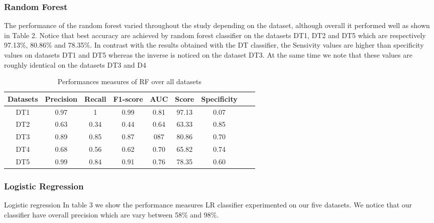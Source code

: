 \subsubsection{Random Forest}
The performance of the random forest varied throughout the study depending on the dataset, although overall it performed well as shown in Table 2. Notice that best accuracy are achieved by random forest classifier on the datasets DT1, DT2 and DT5 which are respectively 97.13\%, 80.86\% and 78.35\%. In contrast with the results obtained with the DT classifier, the Sensivity values are higher than specificity values on datasets DT1 and DT5 whereas the inverse is noticed on the dataset DT3. At the same time we note that these values are roughly identical on the datasets DT3 and D4
\begin{table}[!ht]
\centering
\begin{tabular}{*{7}{c}l r}
  \toprule
  \textbf{Datasets} & \textbf{Precision} & \textbf{Recall} & \textbf{F1-score}&\textbf{AUC} &\textbf{Score} &\textbf{Specificity}\\
   \midrule
  DT1 &0.97 &1   &0.99 &0.81 &97.13& 0.07\\
  DT2 &0.63  & 0.34  &0.44&0.64&63.33& 0.85\\
  DT3 &0.89 &0.85 &0.87&087&80.86&0.70\\
  DT4 &0.68 &0.56&0.62&0.70&65.82&0.74\\
  DT5 &0.99 &0.84&0.91&0.76&78.35&0.60\\
  
  
    \bottomrule
\end{tabular}
\caption{Performances measures of RF over all datasets}\label{perf-measure-dt1}
\end{table}


\subsubsection{Logistic Regression}

Logistic regression In table 3 we show the performance measures LR classifier experimented on our five datasets. We notice that our classifier have overall precision which are vary between 58\% and 98\%. 

